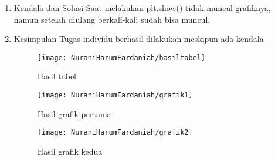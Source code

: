 \begin{enumerate}
\item Kendala dan Solusi
\newline Saat melakukan plt.show() tidak muncul grafiknya,  namun setelah diulang berkali-kali sudah bisa muncul.
\item Kesimpulan
\newline Tugas individu berhasil dilakukan meskipun ada kendala
\begin{figure}[!ht]
\texttt{[image: NuraniHarumFardaniah/hasiltabel]}
\caption{Hasil tabel}
\label{gam:hasil tabel}
\end{figure}
\newpage
\begin{figure}[!ht]
\texttt{[image: NuraniHarumFardaniah/grafik1]}
\caption{Hasil grafik pertama}
\label{gam:grafik1}
\end{figure}

\begin{figure}[!ht]
\texttt{[image: NuraniHarumFardaniah/grafik2]}
\caption{Hasil grafik kedua}
\label{gam:grafik2}
\end{figure}

\end{enumerate}